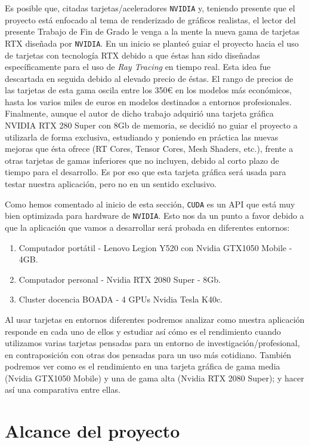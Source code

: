 \documentclass[titlepage,12pt]{report}
\begin{document}
Es posible que, citadas tarjetas/aceleradores \texttt{NVIDIA} y, teniendo presente que el proyecto está enfocado al tema de renderizado de gráficos realistas, el lector del presente Trabajo de Fin de Grado le venga a la mente la nueva gama de tarjetas RTX diseñada por \texttt{NVIDIA}. En un inicio se planteó guiar el proyecto hacia el uso de tarjetas con tecnología RTX debido a que éstas han sido diseñadas específicamente para el uso de \textit{Ray Tracing} en tiempo real. Esta idea fue descartada en seguida debido al elevado precio de éstas. El rango de precios de las tarjetas de esta gama oscila entre los 350€ en los modelos más económicos, hasta los varios miles de euros en modelos destinados a entornos profesionales. Finalmente, aunque el autor de dicho trabajo adquirió una tarjeta gráfica NVIDIA RTX 280 Super con 8Gb de memoria, se decidió no guiar el proyecto a utilizarla de forma exclusiva, estudiando y poniendo en práctica las nuevas mejoras que ésta ofrece (RT Cores, Tensor Cores, Mesh Shaders, etc.), frente a otras tarjetas de gamas inferiores que no incluyen, debido al corto plazo de tiempo para el desarrollo. Es por eso que esta tarjeta gráfica será usada para testar nuestra aplicación, pero no en un sentido exclusivo.

Como hemos comentado al inicio de esta sección, \texttt{CUDA} es un API que está muy bien optimizada para hardware de \texttt{NVIDIA}. Esto nos da un punto a favor debido a que la aplicación que vamos a desarrollar será probada en diferentes entornos:

\begin{enumerate}
	\item Computador portátil - Lenovo Legion Y520 con Nvidia GTX1050 Mobile - 4GB.
	\item Computador personal - Nvidia RTX 2080 Super - 8Gb.
	\item Cluster docencia BOADA - 4 GPUs Nvidia Tesla K40c.
\end{enumerate}

Al usar tarjetas en entornos diferentes podremos analizar como nuestra aplicación responde en cada uno de ellos y estudiar así cómo es el rendimiento cuando utilizamos varias tarjetas pensadas para un entorno de investigación/profesional, en contraposición con otras dos pensadas para un uso más cotidiano. También podremos ver como es el rendimiento en una tarjeta gráfica de gama media (Nvidia GTX1050 Mobile) y una de gama alta (Nvidia RTX 2080 Super); y hacer así una comparativa entre ellas.

\section{Alcance del proyecto}
\end{document}
